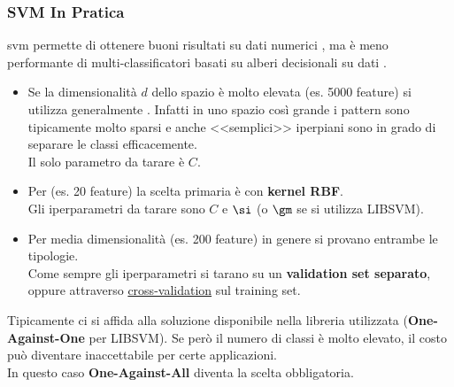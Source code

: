 \subsubsection{SVM In Pratica}\label{sec:svm_in_pratica} %
\begin{note}
    \ac{svm} permette di ottenere buoni risultati su dati numerici , ma è meno performante di multi-classificatori basati su alberi decisionali su dati .
\end{note}
\begin{note}
    \begin{itemize}
        \item Se la dimensionalità $d$ dello spazio è molto elevata (es. 5000 feature) si utilizza generalmente .
            Infatti in uno spazio così grande i pattern sono tipicamente molto sparsi e anche <<semplici>> iperpiani sono in grado di separare le classi efficacemente.
            \\
            Il solo parametro da tarare è $C$.
        \item Per  (es. 20 feature) la scelta primaria è  con \textbf{kernel RBF}.
            \\
            Gli iperparametri da tarare sono $C$ e $\si$ (o $\gm$ se si utilizza LIBSVM).
        \item Per media dimensionalità (es. 200 feature) in genere si provano entrambe le tipologie.
            \\
            Come sempre gli iperparametri si tarano su un \textbf{validation set separato}, oppure attraverso \hyperref[par:k-fold-cross-val]{cross-validation} sul training set.
    \end{itemize}
\end{note}
\begin{note}
    Tipicamente ci si affida alla soluzione disponibile nella libreria utilizzata (\textbf{One-Against-One} per LIBSVM).
    Se però il numero di classi è molto elevato, il costo può diventare inaccettabile per certe applicazioni.
    \\
    In questo caso \textbf{One-Against-All} diventa la scelta obbligatoria.
\end{note}
%
